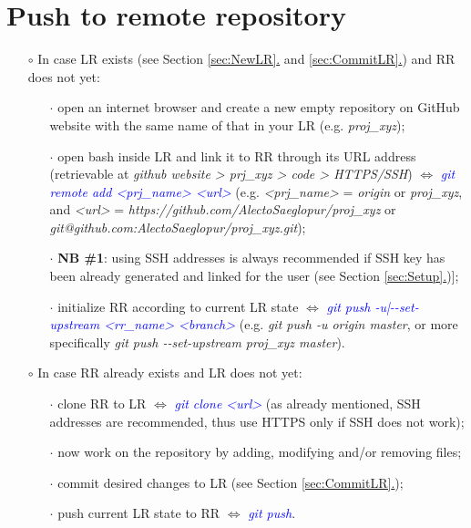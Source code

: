 \documentclass[a4paper,portrait,10pt]{article}   %
\newcommand{\mydiv}{$\Leftrightarrow$ }   %
\newcommand{\mycmd}[1]{\textcolor{blue}{\textit{#1}}}   %
\newcommand{\myvspace}{\vspace{4mm}}   %
\newcommand{\mysecref}[1]{\hyperref[#1]{\ref{#1}.}}   %
\begin{document}
\section{Push to remote repository}   \label{sec:PushRR}

\begin{itemize}
\item[$\circ$] In case LR exists (see Section \mysecref{sec:NewLR} and \mysecref{sec:CommitLR}) and RR does not yet:
\begin{itemize}
  \item[$\cdot$] open an internet browser and create a new empty repository on GitHub website with the same name of that in your LR (e.g. \textit{proj\_xyz});
  \item[$\cdot$] open bash inside LR and link it to RR through its URL address (retrievable at \textit{github website > prj\_xyz > code > HTTPS/SSH}) \mydiv \mycmd{git remote add <prj\_name> <url>} (e.g. \textit{<prj\_name>} = \textit{origin} or \textit{proj\_xyz}, and \textit{<url>} = \textit{https://github.com/AlectoSaeglopur/proj\_xyz} or \textit{git@github.com:AlectoSaeglopur/proj\_xyz.git});
  \item[$\cdot$] \textbf{NB \#1}: using SSH addresses is always recommended if SSH key has been already generated and linked for the user (see Section \mysecref{sec:Setup})];
  \item[$\cdot$] initialize RR according to current LR state \mydiv \mycmd{git push -u|-{}-set-upstream <rr\_name> <branch>} (e.g. \textit{git push -u origin master}, or more specifically \textit{git push -{}-set-upstream proj\_xyz master}).
\end{itemize}
\myvspace

\item[$\circ$] In case RR already exists and LR does not yet:
\begin{itemize}
  \item[$\cdot$] clone RR to LR \mydiv \mycmd{git clone <url>} (as already mentioned, SSH addresses are recommended, thus use HTTPS only if SSH does not work);
  \item[$\cdot$] now work on the repository by adding, modifying and/or removing files;
  \item[$\cdot$] commit desired changes to LR (see Section \mysecref{sec:CommitLR});
  \item[$\cdot$] push current LR state to RR \mydiv \mycmd{git push}.
\end{itemize}
\end{itemize}
\myvspace
\end{document}
